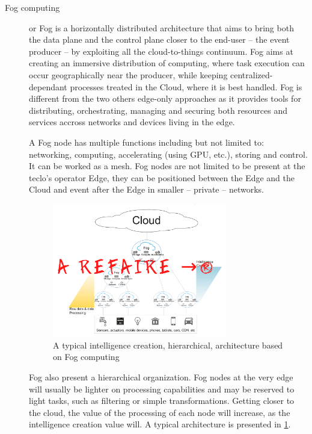 \documentclass[11pt]{sdm}
\begin{document}
\begin{description}
	\item[Fog computing] or Fog is a horizontally distributed architecture that aims to bring both the data plane and the control plane closer to the end-user -- the event producer -- by exploiting all the cloud-to-things continuum. Fog aims at creating an immersive distribution of computing, where task execution can occur geographically near the producer, while keeping centralized-dependant processes treated in the Cloud, where it is best handled. Fog is different from the two others edge-only approaches as it provides tools for distributing, orchestrating, managing and securing both resources and services accross networks and devices living in the edge.
	
	A Fog node has multiple functions including but not limited to: networking, computing, accelerating (using \gls{GPU}, etc.), storing and control. It can be worked as a mesh. Fog nodes are not limited to be present at the teclo's operator Edge, they can be positioned between the Edge and the Cloud and event after the Edge in smaller -- private -- networks.
	
	\begin{figure}[t]
		\centering
		\includegraphics[width=0.75\textwidth]{./assets/FogArchi.png}
		\caption{A typical intelligence creation, hierarchical, architecture based on Fog computing}
		\label{fig:fog_archi}
	\end{figure}
	
	Fog also present a hierarchical organization. Fog nodes at the very edge will usually be lighter on processing capabilities and may be reserved to light tasks, such as filtering or simple transformations. Getting closer to the cloud, the value of the processing of each node will increase, as the intelligence creation value will. A typical architecture is presented in \ref{fig:fog_archi}.
	

\end{description}
\end{document}
